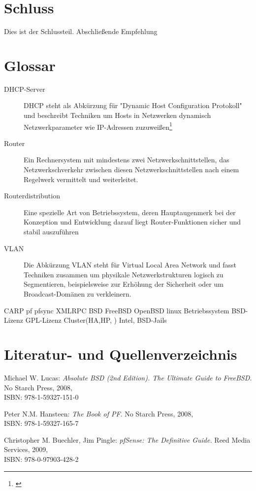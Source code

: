 \documentclass[a4paper,12pt]{scrartcl}
\begin{document}
\section{Schluss}
Dies ist der Schlussteil. Abschlie\ss{}ende Empfehlung

\clearpage
\section{Glossar}
\begin{description}
 \item[DHCP-Server] DHCP steht als Abk\"urzung f\"ur "Dynamic Host
Configuration Protokoll" und beschreibt Techniken um Hosts in Netzwerken
dynamisch Netzwerkparameter wie IP-Adressen zuzuwei\ss{}en\footnote{\cite{dhcp}}
 \item[Router] Ein Rechnersystem mit mindestens zwei Netzwerkschnittstellen,
das Netzwerkschverkehr zwischen diesen Netzwerkschnittstellen nach einem
Regelwerk vermittelt und weiterleitet.
 \item[Routerdistribution] Eine spezielle Art von Betriebssystem, deren
Hauptaugenmerk bei der Konzeption und Entwicklung darauf liegt
Router-Funktionen sicher und stabil auszuf\"uhren
 \item[VLAN] Die Abk\"urzung VLAN steht f\"ur Virtual Local Area Network und
fasst Techniken zusammen um physikale Netzwerkstrukturen logisch zu
Segmentieren, beispielsweise zur Erh\"ohung der Sicherheit oder um
Broadcast-Dom\"anen zu verkleinern.
\end{description}
CARP pf pfsync XMLRPC BSD FreeBSD OpenBSD linux Betriebssystem BSD-Lizenz GPL-Lizenz Cluster(HA,HP, ) Intel, BSD-Jails

\clearpage

\section{Literatur- und Quellenverzeichnis}

\renewcommand\refname{Literaturverzeichnis}
\begin{thebibliography}{999}

Michael W. Lucas:  {\sl Absolute BSD (2nd Edition). The Ultimate Guide to FreeBSD.} No Starch Press, 2008,
\\ISBN: 978-1-59327-151-0

Peter N.M. Hansteen:  {\sl The Book of PF}. No Starch Press, 2008,
\\ISBN: 978-1-59327-165-7

Christopher M. Buechler, Jim Pingle: {\sl pfSense: The Definitive Guide.} Reed Media Services, 2009,
\\ISBN: 978-0-97903-428-2

\end{thebibliography}
\end{document}
